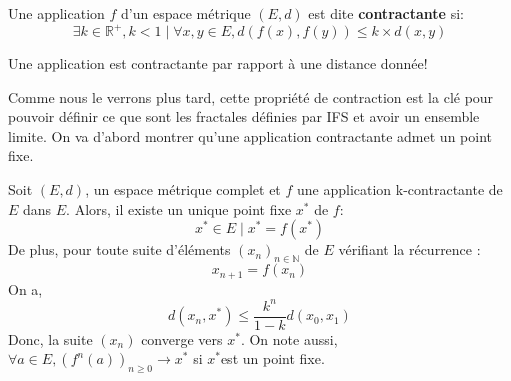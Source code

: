 \documentclass[a4paper, 12pt]{report}
\begin{document}
			\begin{definition}
				Une application $f$ d'un espace métrique $(E,d)$ est dite \textbf{contractante} si:
				\begin{equation}
					\exists k\in\mathds{R}^+, k<1 \mid \forall x,y\in E, d(f(x),f(y))\leqslant k\times d(x,y)
					\label{Pcontractante}
				\end{equation}
			\end{definition}
			
			\begin{remark*}
				Une application est contractante  par rapport à une distance donnée!
			\end{remark*}

			\hspace{.7 cm}Comme nous le verrons plus tard, cette propriété de contraction est la clé pour pouvoir définir ce que sont les fractales définies par IFS et avoir un ensemble limite. On va d'abord montrer qu'une application contractante admet un point fixe.
			
			\begin{theorem}
				\label{ThmPtFixe}
				Soit $(E,d)$, un espace métrique complet et $f$ une application k-contractante de $E$ dans $E$. Alors, il existe un unique point fixe $x^*$ de $f$:
				\begin{equation*}
					x^*\in E\mid x^*=f(x^*)
				\end{equation*}
				De plus, pour toute suite d'éléments $(x_n)_{n\in\mathds{N}}$ de $E$ vérifiant la récurrence :
				\begin{equation*}
					x_{n+1}=f(x_n)
				\end{equation*}
				On a,
				\begin{equation}
					d(x_n,x^*)\leq \frac{k^n}{1-k} d(x_0,x_1)
				\end{equation}
				Donc, la suite $(x_n)$ converge vers $x^*$.
				On note aussi, $\forall a\in E,(f^n(a))_{n\geq 0}\longrightarrow x^*$ si $x^*$est un point fixe.
			\end{theorem}
\end{document}
